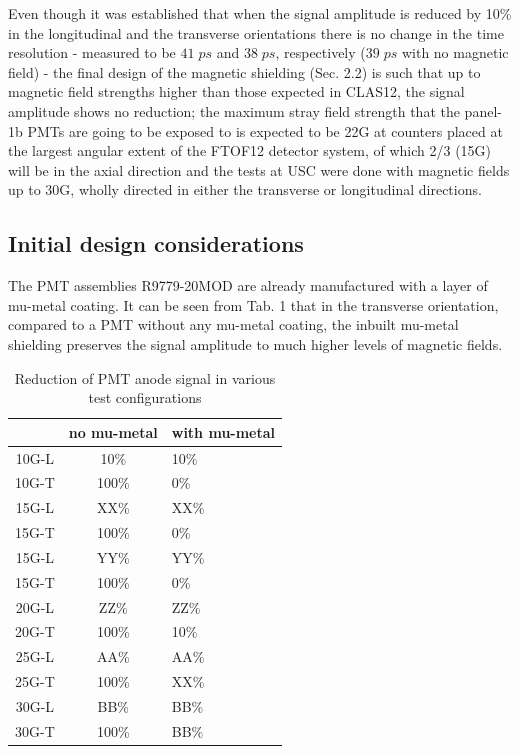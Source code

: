 \documentclass[12pt]{article}
\begin{document}
Even though it was established that when the signal amplitude is reduced by 10\% in the longitudinal and the transverse orientations there is no change in the time resolution - measured to be $41\;ps$ and $38\;ps$, respectively ($39\;ps$ with no magnetic field) \cite{Steinman} -  the final design of the magnetic shielding (Sec. 2.2) is such that up to magnetic field strengths higher than those expected in CLAS12, the signal amplitude shows no reduction; the maximum stray field strength that the panel-1b PMTs are going to be exposed to is expected to be 22G at counters placed at the largest angular extent of the FTOF12 detector system, of which 2/3 (15G) will be in the axial direction \cite{CLAS12FTOFstudies} and the tests at USC were done with magnetic fields up to 30G, wholly directed in either the transverse or longitudinal directions.

\subsection{Initial design considerations}
The PMT assemblies R9779-20MOD are already manufactured with a layer of mu-metal coating. It can be seen from Tab. 1 that in the transverse orientation, compared to a PMT without any mu-metal coating, the inbuilt mu-metal shielding preserves the signal amplitude to much higher levels of magnetic fields.

\begin{table}[H]
	\begin{center}
		\begin{tabular}{|c|c|l|}
			\hline
	 		& no mu-metal & with mu-metal \\
			\hline
 			10G-L & 10\% & 10\% \\
 			10G-T & 100\% & 0\% \\ 
 			\hline
 			15G-L & XX\% & XX\% \\
 			15G-T & 100\% & 0\% \\
 			\hline
 			15G-L & YY\% & YY\% \\
 			15G-T & 100\% & 0\% \\
 			\hline
 			20G-L & ZZ\% & ZZ\% \\
 			20G-T & 100\% & 10\% \\
 			\hline
 			25G-L & AA\% & AA\% \\
 			25G-T & 100\% & XX\% \\
 			\hline
 			30G-L & BB\% & BB\% \\
 			30G-T & 100\% & BB\% \\
 			\hline
		\end{tabular}
	\end{center}
	\caption{Reduction of PMT anode signal in various test configurations}
\end{table}
\end{document}
